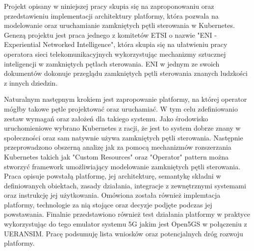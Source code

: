 Projekt opisany w niniejszej pracy skupia się na zaproponowaniu oraz przedstawieniu implementacji  architektury platformy, która pozwala na modelowanie oraz uruchamianie zamkniętych pętli sterowania w Kubernetes. Genezą projektu jest praca jednego z komitetów ETSI o nazwie "ENI - Experiential Networked Intelligence", która skupia się na ułatwieniu pracy operatora sieci telekomunikacyjnych wykorzystując mechanizmy sztucznej inteligencji w zamkniętych pętlach sterowania. ENI w jednym ze swoich dokumentów dokonuje przeglądu zamkniętych pętli sterowania znanych ludzkości z innych dziedzin. 

Naturalnym następnym krokiem jest zapropowanie platformy, na której operator mógłby takowe pętle projektować oraz uruchamiać. W tym celu zdefiniowanio zestaw wymagań oraz założeń dla takiego systemu. Jako środowisko uruchomieniowe wybrano  Kubernetes z racji, że jest to system dobrze znany w społeczności oraz sam natywnie używa zamkniętych pętli sterowania. Następnie przeprowadzono obszerną analizę jak za pomocą mechanizmów rozszerzania Kubernetes takich jak "Custom Resources" oraz "Operator" pattern można stworzyć framework umożliwiający modelowanie zamkniętych pętli sterowania. Praca opisuje powstałą platformę, jej architekturę, semantykę składni w definiowanych obiektach, zasady działania, integracje z zewnętrznymi systemami oraz instrukcję jej użytkowania. Omówiona została również implemtacja platformy, technologie za nią stojące oraz decyzje podjęte podczas jej powstawania. Finalnie przedstawiono również test działania platformy w praktyce wykorzystując do tego emulator systemu 5G jakim jest Open5GS w połączeniu z UERANSIM. Pracę podsumuję lista wniosków oraz potencjalnych dróg rozwoju platformy. 